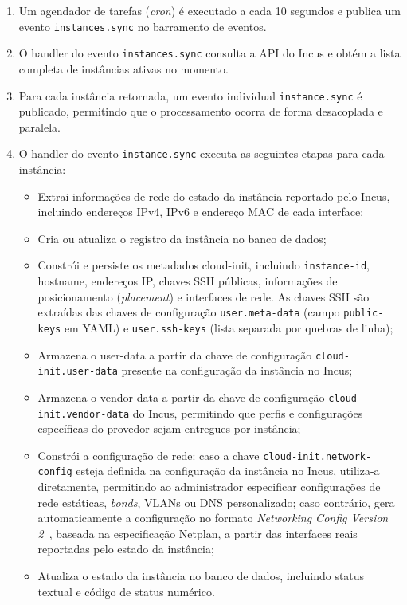 \begin{enumerate}
    \item Um agendador de tarefas (\textit{cron}) é executado a cada 10 segundos e publica um evento \texttt{instances.sync} no barramento de eventos.

    \item O handler do evento \texttt{instances.sync} consulta a API do Incus e obtém a lista completa de instâncias ativas no momento.

    \item Para cada instância retornada, um evento individual \texttt{instance.sync} é publicado, permitindo que o processamento ocorra de forma desacoplada e paralela.

    \item O handler do evento \texttt{instance.sync} executa as seguintes etapas para cada instância:
    \begin{itemize}
        \item Extrai informações de rede do estado da instância reportado pelo Incus, incluindo endereços IPv4, IPv6 e endereço MAC de cada interface;
        \item Cria ou atualiza o registro da instância no banco de dados;
        \item Constrói e persiste os metadados cloud-init, incluindo \texttt{instance-id}, hostname, endereços IP, chaves SSH públicas, informações de posicionamento (\textit{placement}) e interfaces de rede. As chaves SSH são extraídas das chaves de configuração \texttt{user.meta-data} (campo \texttt{public-keys} em YAML) e \texttt{user.ssh-keys} (lista separada por quebras de linha);
        \item Armazena o user-data a partir da chave de configuração \texttt{cloud-init.user-data} presente na configuração da instância no Incus;
        \item Armazena o vendor-data a partir da chave de configuração \texttt{cloud-init.vendor-data} do Incus, permitindo que perfis e configurações específicas do provedor sejam entregues por instância;
        \item Constrói a configuração de rede: caso a chave \texttt{cloud-init.network-config} esteja definida na configuração da instância no Incus, utiliza-a diretamente, permitindo ao administrador especificar configurações de rede estáticas, \textit{bonds}, VLANs ou DNS personalizado; caso contrário, gera automaticamente a configuração no formato \textit{Networking Config Version 2}~\citep{cloudinit_netv2}, baseada na especificação Netplan, a partir das interfaces reais reportadas pelo estado da instância;
        \item Atualiza o estado da instância no banco de dados, incluindo status textual e código de status numérico.
    \end{itemize}
\end{enumerate}


